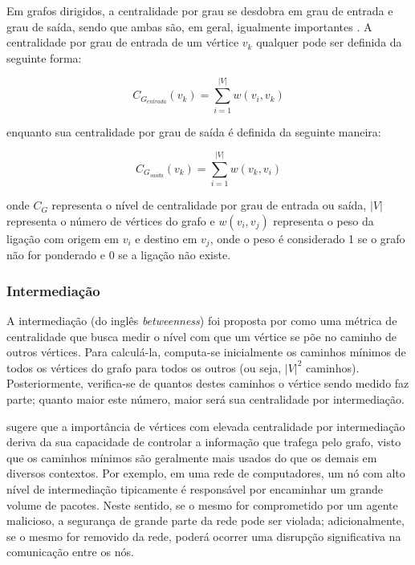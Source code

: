 Em grafos dirigidos, a centralidade por grau se desdobra em grau de entrada e grau de saída, sendo que ambas são, em geral, igualmente importantes \cite{Newman2010}. A centralidade por grau de entrada de um vértice $v_k$ qualquer pode ser definida da seguinte forma:

\begin{equation}
    \label{eq:indegree}
    C_{G_{entrada}}(v_k) = \sum_{i=1}^{|V|} w(v_i, v_k)
\end{equation}

\noindent enquanto sua centralidade por grau de saída é definida da seguinte maneira:

\begin{equation}
    \label{eq:outdegree}
    C_{G_{saida}}(v_k) = \sum_{i=1}^{|V|} w(v_k, v_i)
\end{equation}

\noindent onde $C_G$ representa o nível de centralidade por grau de entrada ou saída, $|V|$ representa o número de vértices do grafo e $w(v_i, v_j)$ representa o peso da ligação com origem em $v_i$ e destino em $v_j$, onde o peso é considerado 1 se o grafo não for ponderado e 0 se a ligação não existe.

\subsubsection{Intermediação} \label{sec:betweenness}

A intermediação (do inglês \textit{betweenness}) foi proposta por  como uma métrica de centralidade que busca medir o nível com que um vértice se põe no caminho de outros vértices. Para calculá-la, computa-se inicialmente os caminhos mínimos de todos os vértices do grafo para todos os outros (ou seja, $|V|^2$ caminhos). Posteriormente, verifica-se de quantos destes caminhos o vértice sendo medido faz parte; quanto maior este número, maior será sua centralidade por intermediação.

 sugere que a importância de vértices com elevada centralidade por intermediação deriva da sua capacidade de controlar a informação que trafega pelo grafo, visto que os caminhos mínimos são geralmente mais usados do que os demais em diversos contextos. Por exemplo, em uma rede de computadores, um nó com alto nível de intermediação tipicamente é responsável por encaminhar um grande volume de pacotes. Neste sentido, se o mesmo for comprometido por um agente malicioso, a segurança de grande parte da rede pode ser violada; adicionalmente, se o mesmo for removido da rede, poderá ocorrer uma disrupção significativa na comunicação entre os nós.

